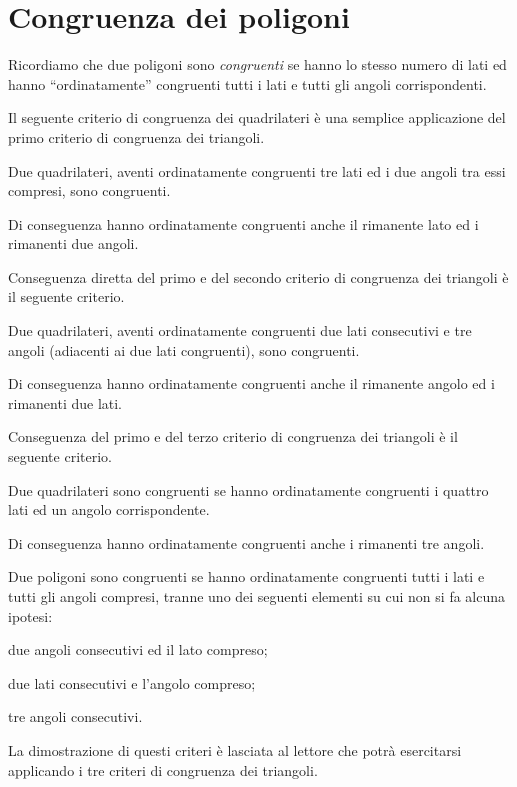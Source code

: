 \section{Congruenza dei poligoni}\label{sect:congruenza_poligoni}

Ricordiamo che due poligoni sono \emph{congruenti} se hanno lo stesso 
numero di lati ed hanno ``ordinatamente'' congruenti tutti i lati e 
tutti gli angoli corrispondenti.

Il seguente criterio di congruenza dei quadrilateri è una semplice 
applicazione del primo criterio di congruenza dei triangoli.
\begin{teorema}
Due quadrilateri, aventi ordinatamente congruenti tre lati ed i due 
angoli tra essi compresi, sono congruenti.
\end{teorema}
Di conseguenza hanno ordinatamente congruenti anche il rimanente lato 
ed i rimanenti due angoli.

Conseguenza diretta del primo e del secondo criterio di congruenza 
dei triangoli è il seguente criterio.
\begin{teorema}
Due quadrilateri, aventi ordinatamente congruenti due lati 
consecutivi e tre angoli (adiacenti ai due lati congruenti), sono 
congruenti.
\end{teorema}
Di conseguenza hanno ordinatamente congruenti anche il rimanente 
angolo ed i rimanenti due lati.

Conseguenza del primo e del terzo criterio di congruenza dei 
triangoli è il seguente criterio.
\begin{teorema}
Due quadrilateri sono congruenti se hanno ordinatamente congruenti i 
quattro lati ed un angolo corrispondente.
\end{teorema}
Di conseguenza hanno ordinatamente congruenti anche i rimanenti tre 
angoli.

\begin{teorema}
Due poligoni sono congruenti se hanno ordinatamente congruenti tutti 
i lati e tutti gli angoli compresi, tranne uno dei seguenti elementi 
su cui non si fa alcuna ipotesi:
\begin{itemize*}
\item due angoli consecutivi ed il lato compreso;
\item due lati consecutivi e l'angolo compreso;
\item tre angoli consecutivi.
\end{itemize*}
\end{teorema}

La dimostrazione di questi criteri è lasciata al lettore che potrà 
esercitarsi applicando i tre criteri di congruenza dei triangoli.

% 
% 
% 
% 
